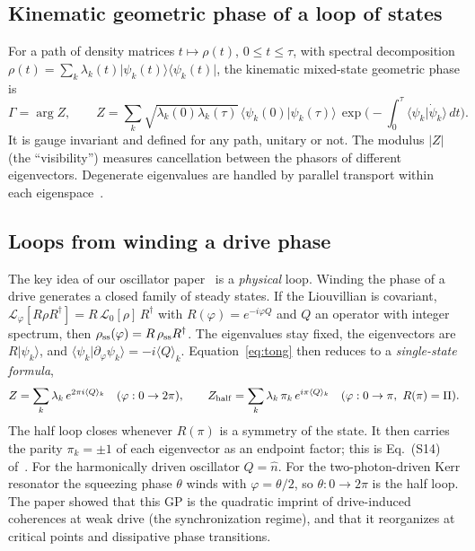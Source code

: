 \documentclass[11pt,a4paper]{article}
\newcommand{\ket}[1]{\lvert #1\rangle}
\newcommand{\bra}[1]{\langle #1\rvert}
\newcommand{\braket}[2]{\langle #1\vert #2\rangle}
\newcommand{\ev}[1]{\langle #1\rangle}
\newcommand{\Lio}{\mathcal{L}}
\begin{document}
\subsection{Kinematic geometric phase of a loop of states}

For a path of density matrices $t\mapsto\rho(t)$, $0\le t\le\tau$, with spectral decomposition
$\rho(t)=\sum_k\lambda_k(t)\ket{\psi_k(t)}\bra{\psi_k(t)}$, the kinematic mixed-state geometric
phase is~\cite{tong2004}
\begin{equation}
\Gamma=\arg Z,\qquad
Z=\sum_k\sqrt{\lambda_k(0)\lambda_k(\tau)}\,\braket{\psi_k(0)}{\psi_k(\tau)}\,
\exp\!\Big(-\!\int_0^\tau\braket{\psi_k}{\dot\psi_k}\,dt\Big).
\label{eq:tong}
\end{equation}
It is gauge invariant and defined for any path, unitary or not. The modulus $|Z|$ (the
``visibility'') measures cancellation between the phasors of different eigenvectors.
Degenerate eigenvalues are handled by parallel transport within each eigenspace~\cite{singh2003}.

\subsection{Loops from winding a drive phase}

The key idea of our oscillator paper~\cite{sun_gp} is a \emph{physical} loop. Winding the phase
of a drive generates a closed family of steady states. If the Liouvillian is covariant,
$\Lio_\varphi[R\rho R^\dagger]=R\,\Lio_0[\rho]\,R^\dagger$ with $R(\varphi)=e^{-i\varphi Q}$ and
$Q$ an operator with integer spectrum, then $\rho_{\rm ss}(\varphi)=R\,\rho_{\rm ss}R^\dagger$.
The eigenvalues stay fixed, the eigenvectors are $R\ket{\psi_k}$, and
$\braket{\psi_k}{\partial_\varphi\psi_k}=-i\ev{Q}_k$. Equation~\eqref{eq:tong} then reduces to
a \emph{single-state formula},
\begin{equation}
Z=\sum_k\lambda_k\,e^{2\pi i\ev{Q}_k}\quad(\varphi:0\to2\pi),\qquad
Z_{\rm half}=\sum_k\lambda_k\,\pi_k\,e^{i\pi\ev{Q}_k}\quad(\varphi:0\to\pi,\ R(\pi)=\Pi).
\label{eq:single_state}
\end{equation}
The half loop closes whenever $R(\pi)$ is a symmetry of the state. It then carries the parity
$\pi_k=\pm1$ of each eigenvector as an endpoint factor; this is Eq.~(S14) of~\cite{sun_gp}.
For the harmonically driven oscillator $Q=\hat n$. For the two-photon-driven Kerr resonator the
squeezing phase $\theta$ winds with $\varphi=\theta/2$, so $\theta:0\to2\pi$ is the half loop.
The paper showed that this GP is the quadratic imprint of drive-induced coherences at weak drive
(the synchronization regime), and that it reorganizes at critical points and dissipative phase
transitions.
\end{document}
